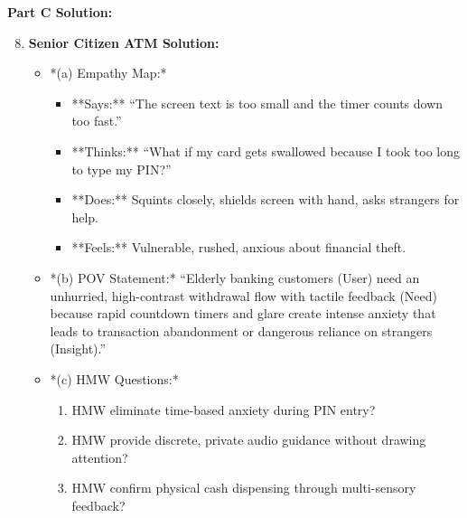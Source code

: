 \begin{solutionbox}
\textbf{Part C Solution:}
\begin{enumerate}[leftmargin=1.2em, itemsep=3pt]
    \setcounter{enumi}{7}
    \item \textbf{Senior Citizen ATM Solution:}
    \begin{itemize}
        \item *(a) Empathy Map:*
        \begin{itemize}
            \item **Says:** ``The screen text is too small and the timer counts down too fast.''
            \item **Thinks:** ``What if my card gets swallowed because I took too long to type my PIN?''
            \item **Does:** Squints closely, shields screen with hand, asks strangers for help.
            \item **Feels:** Vulnerable, rushed, anxious about financial theft.
        \end{itemize}
        \item *(b) POV Statement:* ``Elderly banking customers (User) need an unhurried, high-contrast withdrawal flow with tactile feedback (Need) because rapid countdown timers and glare create intense anxiety that leads to transaction abandonment or dangerous reliance on strangers (Insight).''
        \item *(c) HMW Questions:*
        \begin{enumerate}
            \item HMW eliminate time-based anxiety during PIN entry?
            \item HMW provide discrete, private audio guidance without drawing attention?
            \item HMW confirm physical cash dispensing through multi-sensory feedback?
        \end{enumerate}
    \end{itemize}
\end{enumerate}
\end{solutionbox}
